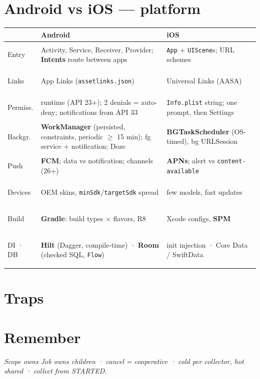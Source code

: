 \documentclass[8pt]{extarticle}
\begin{document}
\begin{multicols}{2}
\section{Android vs iOS — platform}
{\scriptsize
\noindent\begin{tabularx}{\linewidth}{@{}>{\bfseries\raggedright\arraybackslash}p{12mm}LL@{}}
\toprule
 & \textbf{Android} & \textbf{iOS} \\
\midrule
Entry & Activity, Service, Receiver, Provider; \textbf{Intents} route between apps &
  \texttt{App} + \texttt{UIScene}s; URL schemes \\
Links & App Links (\texttt{assetlinks.json}) & Universal Links (AASA) \\
Permiss. & runtime (API 23+); 2 denials = auto-deny; notifications from API 33 &
  \texttt{Info.plist} string; one prompt, then Settings \\
Backgr. & \textbf{WorkManager} (persisted, constraints, periodic $\geq$ 15 min); fg service
  + notification; Doze & \textbf{BGTaskScheduler} (OS-timed), bg URLSession \\
Push & \textbf{FCM}; data vs notification; channels (26+) & \textbf{APNs}; alert vs
  \texttt{content-available} \\
Devices & OEM skins, \texttt{minSdk}/\texttt{targetSdk} spread & few models, fast updates \\
Build & \textbf{Gradle}: build types × flavors, R8 & Xcode configs, \textbf{SPM} \\
DI · DB & \textbf{Hilt} (Dagger, compile-time) · \textbf{Room} (checked SQL, \texttt{Flow})
  & init injection · Core Data / SwiftData \\
\bottomrule
\end{tabularx}}

\section{Traps}
\begin{itemize}\raggedright
\end{itemize}

\section{Remember}
\emph{Scope owns Job owns children · cancel = cooperative · cold per collector, hot shared ·
collect from STARTED.}


\end{multicols}

\end{document}
